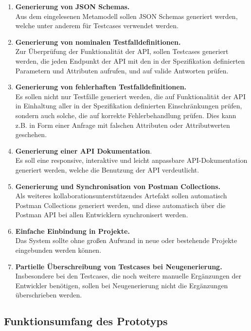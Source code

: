 \begin{enumerate}
	\item \textbf{Generierung von JSON Schemas.} \\
	Aus dem eingelesenen Metamodell sollen JSON Schemas generiert werden, welche unter anderem für Testcases verwendet werden.
	\item \textbf{Generierung von nominalen Testfalldefinitionen.} \\
	Zur Überprüfung der Funktionalität der API, sollen Testcases generiert werden, die jeden Endpunkt der API mit den in der Spezifikation definierten Parametern und Attributen aufrufen, und auf valide Antworten prüfen.
	\item \textbf{Generierung von fehlerhaften Testfalldefinitionen.} \\
	Es sollen nicht nur Testfälle generiert werden, die auf Funktionalität der API in Einhaltung aller in der Spezifikation definierten Einschränkungen prüfen, sondern auch solche, die auf korrekte Fehlerbehandlung prüfen. Dies kann z.B. in Form einer Anfrage mit falschen Attributen oder Attributwerten geschehen.
	\item \textbf{Generierung einer API Dokumentation}. \\
	Es soll eine responsive, interaktive und leicht anpassbare API-Dokumentation generiert werden, welche die Benutzung der API verdeutlicht.
	\item \textbf{Generierung und Synchronisation von Postman Collections.} \\
	Als weiteres kollaborationsunterstützendes Artefakt sollen automatisch Postman Collections generiert werden, und diese automatisch über die Postman API bei allen Entwicklern synchronisert werden.
	\item \textbf{Einfache Einbindung in Projekte.} \\
	Das System sollte ohne großen Aufwand in neue oder bestehende Projekte eingebunden werden können.  
	\item \textbf{Partielle Überschreibung von Testcases bei Neugenerierung. } \\
	Insbesondere bei den Testcases, die noch weitere manuelle Ergänzungen der Entwickler benötigen, sollen bei Neugenerierung nicht die Ergänzungen überschrieben werden.
\end{enumerate}

\subsection{Funktionsumfang des Prototyps}
